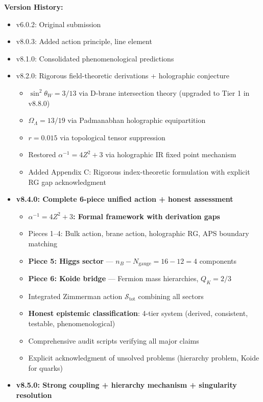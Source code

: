 \documentclass[12pt,a4paper]{article}
\newcommand{\OmegaL}{\Omega_\Lambda}
\newcommand{\sinW}{\sin^2\theta_W}
\newcommand{\Zsq}{Z^2}
\begin{document}
\textbf{Version History:}
\begin{itemize}[itemsep=0pt]
    \item v6.0.2: Original submission
    \item v8.0.3: Added action principle, line element
    \item v8.1.0: Consolidated phenomenological predictions
    \item v8.2.0: Rigorous field-theoretic derivations + holographic conjecture
    \begin{itemize}[itemsep=0pt]
        \item $\sinW = 3/13$ via D-brane intersection theory (upgraded to Tier 1 in v8.8.0)
        \item $\OmegaL = 13/19$ via Padmanabhan holographic equipartition
        \item $r = 0.015$ via topological tensor suppression
        \item Restored $\alpha^{-1} = 4\Zsq + 3$ via holographic IR fixed point mechanism
        \item Added Appendix C: Rigorous index-theoretic formulation with explicit RG gap acknowledgment
    \end{itemize}
    \item \textbf{v8.4.0: Complete 6-piece unified action + honest assessment}
    \begin{itemize}[itemsep=0pt]
        \item \textbf{$\alpha^{-1} = 4\Zsq + 3$: Formal framework with derivation gaps}
        \item Pieces 1--4: Bulk action, brane action, holographic RG, APS boundary matching
        \item \textbf{Piece 5: Higgs sector} --- $n_B - N_{\text{gauge}} = 16 - 12 = 4$ components
        \item \textbf{Piece 6: Koide bridge} --- Fermion mass hierarchies, $Q_K = 2/3$
        \item Integrated Zimmerman action $\mathcal{S}_{\text{tot}}$ combining all sectors
        \item \textbf{Honest epistemic classification}: 4-tier system (derived, consistent, testable, phenomenological)
        \item Comprehensive audit scripts verifying all major claims
        \item Explicit acknowledgment of unsolved problems (hierarchy problem, Koide for quarks)
    \end{itemize}
    \item \textbf{v8.5.0: Strong coupling + hierarchy mechanism + singularity resolution}

\end{itemize}
\end{document}
